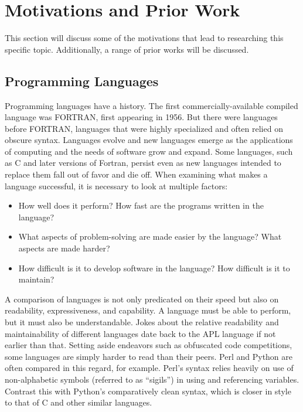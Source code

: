 \section{Motivations and Prior Work}
\label{sec:motivations}

This section will discuss some of the motivations that lead to researching this specific topic. Additionally, a range of prior works will be discussed.

\subsection{Programming Languages}

Programming languages have a history. The first commercially-available compiled language was FORTRAN, first appearing in 1956. But there were languages before FORTRAN, languages that were highly specialized and often relied on obscure syntax. Languages evolve and new languages emerge as the applications of computing and the needs of software grow and expand. Some languages, such as C and later versions of Fortran, persist even as new languages intended to replace them fall out of favor and die off. When examining what makes a language successful, it is necessary to look at multiple factors:

\begin{itemize}
\item How well does it perform? How fast are the programs written in the language?
\item What aspects of problem-solving are made easier by the language? What aspects are made harder?
\item How difficult is it to develop software in the language? How difficult is it to maintain?
\end{itemize}

A comparison of languages is not only predicated on their speed but also on readability, expressiveness, and capability. A language must be able to perform, but it must also be understandable. Jokes about the relative readability and maintainability of different languages date back to the APL language if not earlier than that. Setting aside endeavors such as obfuscated code competitions, some languages are simply harder to read than their peers. Perl and Python are often compared in this regard, for example. Perl's syntax relies heavily on use of non-alphabetic symbols (referred to as ``sigils'') in using and referencing variables. Contrast this with Python's comparatively clean syntax, which is closer in style to that of C and other similar languages.

